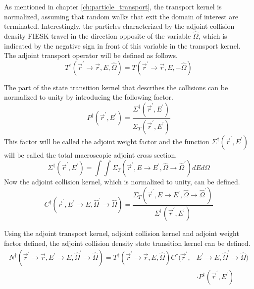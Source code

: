 As mentioned in chapter \ref{ch:particle_transport}, the transport 
kernel is normalized, assuming that random walks that exit the domain of 
interest are terminated. Interestingly, the particles characterized by the 
adjoint collision density FIESK travel in the direction opposite of the 
variable $\hat{\Omega}$, which is indicated by the negative sign in front of
this variable in the transport kernel. The adjoint transport operator will be
defined as follows.
\begin{equation}
  T^{\dagger}(\vec{r}^{'} \to \vec{r},E,\hat{\Omega}) = 
  T(\vec{r}^{'} \to \vec{r},E,-\hat{\Omega})
  \label{eq:adjoint_transport_kernel}
\end{equation}

The part of the state transition kernel that describes the 
collisions can be normalized to unity by introducing the following factor.
\begin{equation}
  P^{\dagger}(\vec{r}^{'},E^{'}) = 
  \frac{\Sigma^{\dagger}(\vec{r}^{'},E^{'})}{\Sigma_T(\vec{r}^{'},E^{'})}
  \label{eq:adjoint_weight_factor}
\end{equation}
This factor will be called the adjoint weight factor and the function 
$\Sigma^{\dagger}(\vec{r}^{'},E^{'})$ will be called the total macroscopic adjoint 
cross section.
\begin{equation}
  \Sigma^{\dagger}(\vec{r}^{'},E^{'}) = \int\int  
  \Sigma_T(\vec{r}^{'},E \to E^{'},\hat{\Omega} \to \hat{\Omega}^{'}) dE d\Omega
  \label{eq:adjoint_total_cross_section}
\end{equation}
Now the adjoint collision kernel, which is normalized to unity, can be 
defined.
\begin{equation}
  C^{\dagger}(\vec{r}^{'},E^{'} \to E,\hat{\Omega}^{'} \to \hat{\Omega}) = 
  \frac{\Sigma_T(\vec{r}^{'},E \to E^{'},\hat{\Omega} \to \hat{\Omega}^{'})}
       {\Sigma^{\dagger}(\vec{r}^{'},E^{'})}
  \label{eq:adjoint_collision_kernel}
\end{equation}

Using the adjoint transport kernel, adjoint collision kernel and adjoint
weight factor defined, the adjoint collision density state transition kernel
can be defined.
\begin{equation}
  \begin{split}
    N^{\dagger}(\vec{r}^{'} \to \vec{r},E^{'} \to E,\hat{\Omega}^{'} \to \hat{\Omega})
    = T^{\dagger}(\vec{r}^{'} \to \vec{r},E,\hat{\Omega})
    C^{\dagger}(\vec{r}^{'},&E^{'} \to E,\hat{\Omega}^{'} \to \hat{\Omega}) \\
    & \cdot P^{\dagger}(\vec{r}^{'},E^{'})
  \end{split}
\end{equation}

